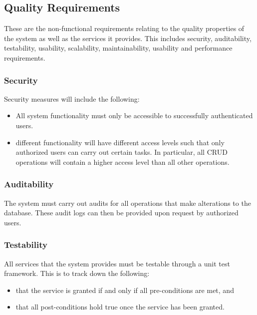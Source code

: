 \documentclass[12pt]{article}
\begin{document}
                    \vspace{0.2in}
               		\subsection{Quality Requirements}
                  	\vspace{0.1in}
                  	These are the non-functional requirements relating to the quality properties of the system as well as the services it provides. This includes security, auditability, testability, usability, scalability, maintainability, usability and performance requirements.
                  	
                  	\vspace{0.1in}
	                   	\subsubsection{Security }
	                   	Security measures will include the following:
	                   	\begin{itemize}
		                   	\item All system functionality must only be accessible to successfully authenticated users.
		                   	\item different functionality will have different access levels such that only authorized users can carry out certain tasks. In particular, all CRUD operations will contain a higher access level than all other operations.
		                   	
	                   	\end{itemize}
	                   	\subsubsection{Auditability}
	                   	The system must carry out audits for all operations that make alterations to the database. These audit logs can then be provided upon request by authorized users.
	                   
	                   \vspace{0.1in}
	                  	\subsubsection{Testability}
	                  	All services that the system provides must be testable through a unit test framework. This is to track down the following:
	                  	\begin{itemize}
	                  		\item that the service is granted if and only if all pre-conditions are met, and
	                  		\item that all post-conditions hold true once the service has been granted.
	                  	\end{itemize}
	                  	
\end{document}
